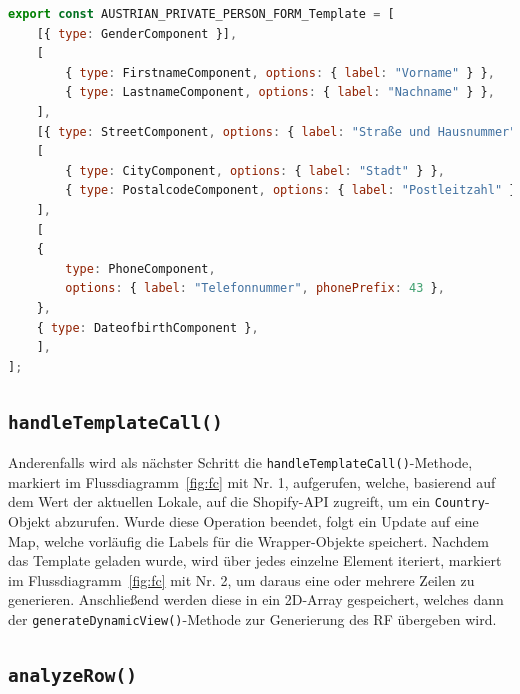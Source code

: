 \begin{lstlisting}[caption={Vordefiniertes Template für das RF}, language=JavaScript,label={lst:template_form_aut}]
export const AUSTRIAN_PRIVATE_PERSON_FORM_Template = [
	[{ type: GenderComponent }],
	[
		{ type: FirstnameComponent, options: { label: "Vorname" } },
		{ type: LastnameComponent, options: { label: "Nachname" } },
	],
	[{ type: StreetComponent, options: { label: "Straße und Hausnummer" } }],
	[
		{ type: CityComponent, options: { label: "Stadt" } },
		{ type: PostalcodeComponent, options: { label: "Postleitzahl" } },
	],
	[
	{
		type: PhoneComponent,
		options: { label: "Telefonnummer", phonePrefix: 43 },
	},
	{ type: DateofbirthComponent },
	],
];
\end{lstlisting}

\subsection{\texttt{handleTemplateCall()}}

Anderenfalls wird als nächster Schritt die \texttt{handleTemplateCall()}-Methode, markiert im Flussdiagramm~\ref{fig:fc} mit Nr. 1, aufgerufen, welche, basierend auf dem Wert der aktuellen Lokale, auf die Shopify-API zugreift, um ein \texttt{Country}-Objekt abzurufen. Wurde diese Operation beendet, folgt ein Update auf eine Map, welche vorläufig die Labels für die Wrapper-Objekte speichert. Nachdem das Template geladen wurde, wird über jedes einzelne Element iteriert, markiert im Flussdiagramm~\ref{fig:fc} mit Nr. 2, um daraus eine oder mehrere Zeilen zu generieren. Anschließend werden diese in ein 2D-Array gespeichert, welches dann der \texttt{generateDynamicView()}-Methode zur Generierung des RF übergeben wird.

\subsection{\texttt{analyzeRow()}} \label{ssec:lblAnalyzeRow}

